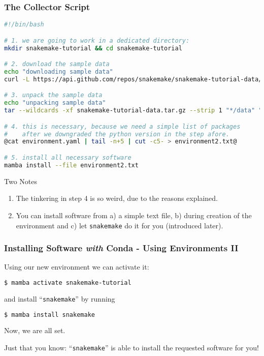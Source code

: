 \begin{frame}[fragile]
  \frametitle{The Collector Script}
  \begin{lstlisting}[language=Bash, style=Shell, basicstyle=\tiny]
#!/bin/bash

# 1. we are going to work in a dedicated directory:
mkdir snakemake-tutorial && cd snakemake-tutorial

# 2. download the sample data
echo "downloading sample data"
curl -L https://api.github.com/repos/snakemake/snakemake-tutorial-data/tarball -o snakemake-tutorial-data.tar.gz

# 3. unpack the sample data
echo "unpacking sample data"
tar --wildcards -xf snakemake-tutorial-data.tar.gz --strip 1 "*/data" "*/environment.yaml"

# 4. this is necessary, because we need a simple list of packages
#    after we downgraded the python version in the step afore.
@cat environment.yaml | tail -n+5 | cut -c5- > environment2.txt@

# 5. install all necessary software
mamba install --file environment2.txt
  \end{lstlisting}
  \begin{block}{Two Notes}
    \begin{enumerate}
     \item The tinkering in step 4 is so weird, due to the reasons explained.
     \item You can install software from a) a simple text file, b) during creation of the environment and c) let \texttt{snakemake} do it for you (introduced later).
    \end{enumerate}
  \end{block}
\end{frame}

\begin{frame}[fragile]
  \frametitle{Installing Software \emph{with} Conda - Using Environments II}
  Using our new environment we can activate it:
  \begin{lstlisting}[language=Bash, style=Shell]
$ mamba activate snakemake-tutorial
  \end{lstlisting}
  and install ``\texttt{snakemake}'' by running
  \begin{lstlisting}[language=Bash, style=Shell]
$ mamba install snakemake
  \end{lstlisting}
  Now, we are all set. 
  \begin{hint}
  	Just that you know: ``\texttt{snakemake}'' is able to install the requested software for you!
  \end{hint}
\end{frame}

